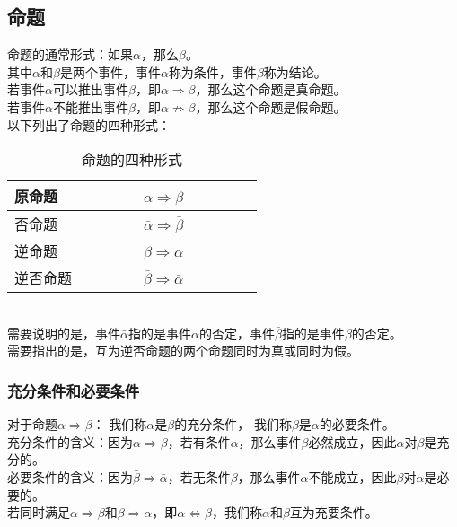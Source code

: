 \documentclass[UTF8]{ctexart}
\begin{document}
\newpage

\subsection{命题}
    命题的通常形式：如果$\alpha$，那么$\beta$。\\[3mm]
    其中$\alpha$和$\beta$是两个事件，事件$\alpha$称为条件，事件$\beta$称为结论。\\[3mm]
    若事件$\alpha$可以推出事件$\beta$，即$\alpha\Rightarrow\beta$，那么这个命题是真命题。\\[3mm]
    若事件$\alpha$不能推出事件$\beta$，即$\alpha\not\Rightarrow\beta$，那么这个命题是假命题。\\[6mm]
    以下列出了命题的四种形式：
    \begin{table}[h]
        \begin{center}
            \begin{tabular}{l|l}
                \hline
                原命题~~~~~~~~&$\alpha\Rightarrow\beta$~~~~~~~~\\ \hline
                否命题~~~~~~~~&$\bar{\alpha}\Rightarrow\bar{\beta}$~~~~~~~~\\ \hline
                逆命题~~~~~~~~&$\beta\Rightarrow\alpha$~~~~~~~~\\ \hline
                逆否命题~~~~~~~~&$\bar{\beta}\Rightarrow\bar{\alpha}$~~~~~~~~\\ \hline
            \end{tabular}
            \caption{命题的四种形式}
        \end{center}
    \end{table}\\
    需要说明的是，事件$\bar{\alpha}$指的是事件$\alpha$的否定，事件$\bar{\beta}$指的是事件$\beta$的否定。\\[3mm]
    需要指出的是，互为逆否命题的两个命题同时为真或同时为假。\\

\subsubsection{充分条件和必要条件}
    对于命题$\alpha\Rightarrow\beta$：
    我们称$\alpha$是$\beta$的充分条件，
    我们称$\beta$是$\alpha$的必要条件。\\[5mm]
    充分条件的含义：因为$\alpha\Rightarrow\beta$，若有条件$\alpha$，那么事件$\beta$必然成立，因此$\alpha$对$\beta$是充分的。\\[3mm]
    必要条件的含义：因为$\bar{\beta}\Rightarrow\bar{\alpha}$，若无条件$\beta$，那么事件$\alpha$不能成立，因此$\beta$对$\alpha$是必要的。\\[5mm]
    若同时满足$\alpha\Rightarrow\beta$和$\beta\Rightarrow\alpha$，即$\alpha\Leftrightarrow\beta$，我们称$\alpha$和$\beta$互为充要条件。
\end{document}
